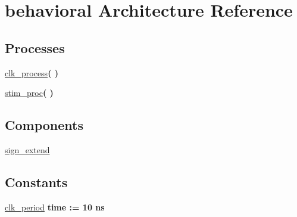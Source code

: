 \hypertarget{classsign__extend__tb_1_1behavioral}{\section{behavioral \-Architecture \-Reference}
\label{classsign__extend__tb_1_1behavioral}
}
\*
\*
\subsection*{\-Processes}
 \begin{DoxyCompactItemize}
\item 
\hypertarget{classsign__extend__tb_1_1behavioral_ac5bb218131b813f7908ec89476b31fca}{\hyperlink{classsign__extend__tb_1_1behavioral_ac5bb218131b813f7908ec89476b31fca}{clk\-\_\-process}{\bfseries  (  )}}\label{classsign__extend__tb_1_1behavioral_ac5bb218131b813f7908ec89476b31fca}

\item 
\hypertarget{classsign__extend__tb_1_1behavioral_ad2efa6785cff833c341e27596b21aeb5}{\hyperlink{classsign__extend__tb_1_1behavioral_ad2efa6785cff833c341e27596b21aeb5}{stim\-\_\-proc}{\bfseries  (  )}}\label{classsign__extend__tb_1_1behavioral_ad2efa6785cff833c341e27596b21aeb5}

\end{DoxyCompactItemize}
\subsection*{\-Components}
 \begin{DoxyCompactItemize}
\item 
\hypertarget{classsign__extend__tb_1_1behavioral_ae8c2ce7af13c1660d88b4bbb78fc2bf1}{\hyperlink{classsign__extend__tb_1_1behavioral_ae8c2ce7af13c1660d88b4bbb78fc2bf1}{sign\-\_\-extend}  {\bfseries }  }\label{classsign__extend__tb_1_1behavioral_ae8c2ce7af13c1660d88b4bbb78fc2bf1}

\end{DoxyCompactItemize}
\subsection*{\-Constants}
 \begin{DoxyCompactItemize}
\item 
\hypertarget{classsign__extend__tb_1_1behavioral_a508d91be85dbb14f5c19987e818c5aa9}{\hyperlink{classsign__extend__tb_1_1behavioral_a508d91be85dbb14f5c19987e818c5aa9}{clk\-\_\-period} {\bfseries time  \-:=  10  ns } }\label{classsign__extend__tb_1_1behavioral_a508d91be85dbb14f5c19987e818c5aa9}

\end{DoxyCompactItemize}
